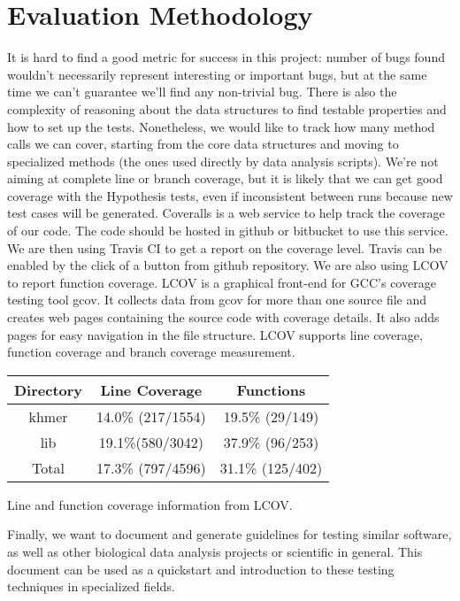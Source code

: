 \documentclass[preprint,nocopyrightspace]{sig-alternate}
\begin{document}
\section{Evaluation Methodology}
It is hard to find a good metric for success in this project:
number of bugs found wouldn't necessarily represent interesting or important bugs,
but at the same time we can't guarantee we'll find any non-trivial bug.
There is also the complexity of reasoning about the data structures to find testable properties and how to set up the tests.
Nonetheless,
we would like to track how many method calls we can cover,
starting from the core data structures and moving to specialized methods (the ones used directly by data analysis scripts).
We're not aiming at complete line or branch coverage,
but it is likely that we can get good coverage with the Hypothesis tests,
even if inconsistent between runs because new test cases will be generated.
Coveralls is a web service to help track the coverage of our code.
The code should be hosted in github or bitbucket to use this service.
We are then using Travis CI to get a report on the coverage level.
Travis can be enabled by the click of a button from github repository.
We are also using LCOV to report function coverage. 
LCOV is a graphical front-end for GCC's coverage testing tool gcov. 
It collects data from gcov for more than one source file and creates web pages containing the 
source code with coverage details. 
It also adds pages for easy navigation in the file structure. 
LCOV supports line coverage, function coverage and branch coverage measurement.

\noindent
\begin{minipage}{\columnwidth}
  \captionsetup{type=table}
  \centering
  \begin{tabular}{|c|c|c|}
  \toprule
  Directory & Line Coverage & Functions \\ 
  \midrule
  khmer		& 14.0\% (217/1554)	& 19.5\% (29/149) \\ 
  lib		& 19.1\%(580/3042)	& 37.9\% (96/253) \\ 
  Total		& 17.3\% (797/4596)	& 31.1\% (125/402) \\
  \bottomrule
  \end{tabular}
  \medskip

  \caption{Line and function coverage information from LCOV.}\label{table:clove}
\end{minipage}

Finally,
we want to document and generate guidelines for testing similar software,
as well as other biological data analysis projects or scientific in general.
This document can be used as a quickstart and introduction to these testing techniques in specialized fields.
\end{document}
